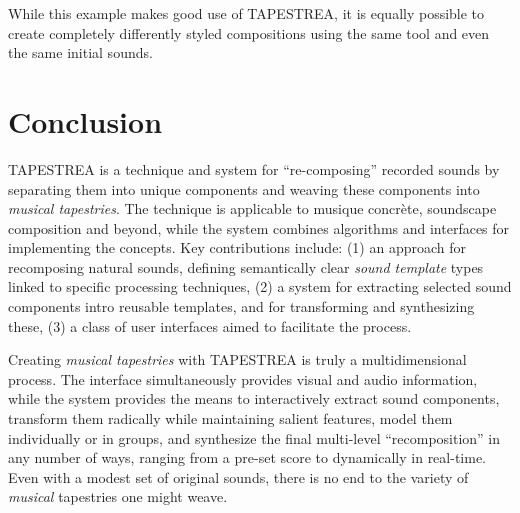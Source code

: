 \documentclass[10pt,letterpaper]{article}
\begin{document}
While this example makes good use of TAPESTREA, it is equally possible
to create completely differently styled compositions using the same tool
and even the same initial sounds.

\section{Conclusion} 

TAPESTREA is a technique and system for ``re-composing'' recorded sounds
by separating them into unique components and weaving these components
into \textit{musical tapestries}. The technique is applicable to musique
concr\`ete, soundscape composition and beyond, while the system combines
algorithms and interfaces for implementing the concepts. Key
contributions include: (1) an approach for recomposing natural sounds,
defining semantically clear {\it sound template} types linked to
specific processing techniques, (2) a system for extracting selected
sound components intro reusable templates, and for transforming and
synthesizing these, (3) a class of user interfaces aimed to facilitate
the process. 

Creating \textit{musical tapestries} with TAPESTREA is truly a
multidimensional process. The interface simultaneously provides visual
and audio information, while the system provides the means to
interactively extract sound components, transform them radically while
maintaining salient features, model them individually or in groups, and
synthesize the final multi-level ``recomposition'' in any number of
ways, ranging from a pre-set score to dynamically in real-time. Even
with a modest set of original sounds, there is no end to the variety of
{\it musical} tapestries one might weave. 




\end{document}
